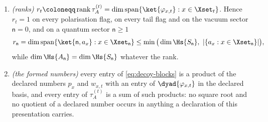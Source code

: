 \begin{proposition}
\begin{enumerate}[label=(\roman*),leftmargin=2.2em]
\begin{equation}
  \tau^{(t)}_A
  =\Big(\sum_{x\in\Xset_t}p_xw_{x,t}\,\dyad{\varphi_{x,t}}\Big)^{\transpose} ,
  \qquad
  g_t\coloneqq\tr\tau^{(t)}_A=\sum_{x\in\Xset_t}p_xw_{x,t} ,
\end{equation}
$g_t$ being the probability of sector $t$ and $\sum_tg_t=1$. On the vacuum
sector and on every flag sector $A_t$ is one dimensional and $\tau^{(t)}_A$ is
the number $g_t$.
\item \emph{(ranks)} $r_t\coloneqq\operatorname{rank}\tau^{(t)}_A
=\dim\operatorname{span}\{\ket{\varphi_{x,t}}:x\in\Xset_t\}$. Hence $r_t=1$ on
every polarisation flag, on every tail flag and on the vacuum sector
$\mathsf{n}=0$, and on a quantum sector $\mathsf{n}\ge1$
\begin{equation}\label{eq:rankbound}
  r_{\mathsf{n}}=\dim\operatorname{span}\{\ket{\mathsf{n},a_x}:x\in\Xset_{\mathsf{n}}\}
  \le\min\big(\dim\Hs{S_{\mathsf{n}}},\ |\{a_x:x\in\Xset_{\mathsf{n}}\}|\big) ,
\end{equation}
while $\dim\Hs{A_{\mathsf{n}}}=\dim\Hs{S_{\mathsf{n}}}$ whatever the rank.
\item \emph{(the formed numbers)} every entry of \eqref{eq:decoy-blocks} is a
product of the declared numbers $p_x$ and $w_{x,t}$ with an entry of
$\dyad{\varphi_{x,t}}$ in the declared basis, and every entry of
$\tau^{(t)}_A$ is a sum of such products: no square root and no quotient of a
declared number occurs in anything a declaration of this presentation carries.
\end{enumerate}
\end{proposition}

